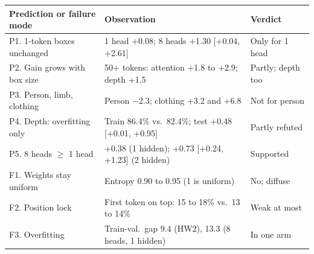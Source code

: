 \documentclass{article} %
\newcommand{\ci}[2]{{\scriptsize[#1, #2]}}
\begin{document}
\vspace{2pt}
\noindent\begin{minipage}{\textwidth}
\centering
{}
\label{tab:check}
\fontsize{8}{9.6}\selectfont
\setlength{\tabcolsep}{3.5pt}
\begin{tabularx}{\textwidth}{@{}L{1.45in}YL{0.9in}@{}}
\toprule
Prediction or failure mode & Observation & Verdict \\
\midrule
P1. 1-token boxes unchanged & 1 head +0.08; 8 heads +1.30 \ci{+0.04}{+2.61} & Only for 1 head \\
P2. Gain grows with box size & 50+ tokens: attention +1.8 to +2.9; depth +1.5 & Partly; depth too \\
P3. Person, limb, clothing & Person $-$2.3; clothing +3.2 and +6.8 & Not for person \\
P4. Depth: overfitting only & Train 86.4\% vs.\ 82.4\%; test +0.48 \ci{+0.01}{+0.95} & Partly refuted \\
P5. 8 heads $\geq$ 1 head & +0.38 (1 hidden); +0.73 \ci{+0.24}{+1.23} (2 hidden) & Supported \\
\midrule
F1. Weights stay uniform & Entropy 0.90 to 0.95 (1 is uniform) & No; diffuse \\
F2. Position lock & First token on top: 15 to 18\% vs.\ 13 to 14\% & Weak at most \\
F3. Overfitting & Train-val.\ gap 9.4 (HW2), 13.3 (8 heads, 1 hidden) & In one arm \\
\bottomrule
\end{tabularx}
\end{minipage}
\end{document}
